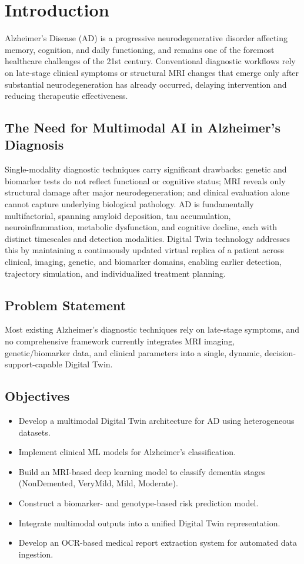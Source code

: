 \documentclass[conference]{IEEEtran}
\begin{document}
\section{Introduction}
Alzheimer's Disease (AD) is a progressive neurodegenerative disorder affecting memory, cognition, and daily functioning, and remains one of the foremost healthcare challenges of the 21st century. Conventional diagnostic workflows rely on late-stage clinical symptoms or structural MRI changes that emerge only after substantial neurodegeneration has already occurred, delaying intervention and reducing therapeutic effectiveness.

\subsection{The Need for Multimodal AI in Alzheimer's Diagnosis}
Single-modality diagnostic techniques carry significant drawbacks: genetic and biomarker tests do not reflect functional or cognitive status; MRI reveals only structural damage after major neurodegeneration; and clinical evaluation alone cannot capture underlying biological pathology. AD is fundamentally multifactorial, spanning amyloid deposition, tau accumulation, neuroinflammation, metabolic dysfunction, and cognitive decline, each with distinct timescales and detection modalities. Digital Twin technology addresses this by maintaining a continuously updated virtual replica of a patient across clinical, imaging, genetic, and biomarker domains, enabling earlier detection, trajectory simulation, and individualized treatment planning.

\subsection{Problem Statement}
Most existing Alzheimer's diagnostic techniques rely on late-stage symptoms, and no comprehensive framework currently integrates MRI imaging, genetic/biomarker data, and clinical parameters into a single, dynamic, decision-support-capable Digital Twin.

\subsection{Objectives}
\begin{itemize}
    \item Develop a multimodal Digital Twin architecture for AD using heterogeneous datasets.
    \item Implement clinical ML models for Alzheimer's classification.
    \item Build an MRI-based deep learning model to classify dementia stages (NonDemented, VeryMild, Mild, Moderate).
    \item Construct a biomarker- and genotype-based risk prediction model.
    \item Integrate multimodal outputs into a unified Digital Twin representation.
    \item Develop an OCR-based medical report extraction system for automated data ingestion.
\end{itemize}
\end{document}
